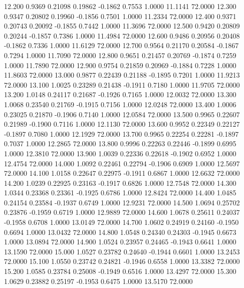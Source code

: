   12.200   0.9369   0.21098   0.19862  -0.1862   0.7553   1.0000  11.1141  72.0000
  12.300   0.9347   0.20802   0.19960  -0.1856   0.7501   1.0000  11.2334  72.0000
  12.400   0.9371   0.20743   0.20092  -0.1855   0.7442   1.0000  11.3696  72.0000
  12.500   0.9420   0.20809   0.20244  -0.1857   0.7386   1.0000  11.4984  72.0000
  12.600   0.9486   0.20956   0.20408  -0.1862   0.7336   1.0000  11.6129  72.0000
  12.700   0.9564   0.21170   0.20584  -0.1867   0.7294   1.0000  11.7090  72.0000
  12.800   0.9651   0.21457   0.20769  -0.1874   0.7259   1.0000  11.7890  72.0000
  12.900   0.9754   0.21859   0.20969  -0.1884   0.7228   1.0000  11.8603  72.0000
  13.000   0.9877   0.22439   0.21188  -0.1895   0.7201   1.0000  11.9213  72.0000
  13.100   1.0025   0.23289   0.21438  -0.1911   0.7180   1.0000  11.9705  72.0000
  13.200   1.0148   0.24117   0.21687  -0.1926   0.7165   1.0000  12.0032  72.0000
  13.300   1.0068   0.23540   0.21769  -0.1915   0.7156   1.0000  12.0248  72.0000
  13.400   1.0006   0.23025   0.21870  -0.1906   0.7140   1.0000  12.0584  72.0000
  13.500   0.9965   0.22607   0.21989  -0.1900   0.7116   1.0000  12.1130  72.0000
  13.600   0.9952   0.22349   0.22127  -0.1897   0.7080   1.0000  12.1929  72.0000
  13.700   0.9965   0.22254   0.22281  -0.1897   0.7037   1.0000  12.2865  72.0000
  13.800   0.9996   0.22263   0.22446  -0.1899   0.6995   1.0000  12.3810  72.0000
  13.900   1.0039   0.22336   0.22618  -0.1902   0.6952   1.0000  12.4754  72.0000
  14.000   1.0092   0.22461   0.22794  -0.1906   0.6909   1.0000  12.5697  72.0000
  14.100   1.0158   0.22647   0.22975  -0.1911   0.6867   1.0000  12.6632  72.0000
  14.200   1.0239   0.22925   0.23163  -0.1917   0.6826   1.0000  12.7548  72.0000
  14.300   1.0344   0.23368   0.23361  -0.1925   0.6786   1.0000  12.8424  72.0000
  14.400   1.0485   0.24154   0.23584  -0.1937   0.6749   1.0000  12.9231  72.0000
  14.500   1.0694   0.25702   0.23876  -0.1959   0.6719   1.0000  12.9889  72.0000
  14.600   1.0678   0.25611   0.24037  -0.1958   0.6708   1.0000  13.0149  72.0000
  14.700   1.0602   0.24919   0.24160  -0.1950   0.6694   1.0000  13.0432  72.0000
  14.800   1.0548   0.24340   0.24303  -0.1945   0.6673   1.0000  13.0894  72.0000
  14.900   1.0524   0.23957   0.24465  -0.1943   0.6641   1.0000  13.1590  72.0000
  15.000   1.0527   0.23782   0.24640  -0.1944   0.6601   1.0000  13.2453  72.0000
  15.100   1.0550   0.23742   0.24821  -0.1946   0.6558   1.0000  13.3382  72.0000
  15.200   1.0585   0.23784   0.25008  -0.1949   0.6516   1.0000  13.4297  72.0000
  15.300   1.0629   0.23882   0.25197  -0.1953   0.6475   1.0000  13.5170  72.0000
